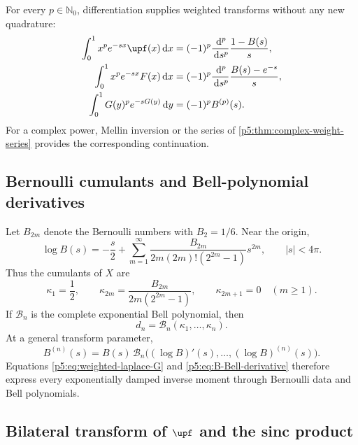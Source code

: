 \documentclass[11pt,oneside]{article}
\theoremstyle{definition}
\theoremstyle{remark}
\newcommand{\N}{\mathbb N}
\newcommand{\dd}{\,\mathrm d}
\newcommand{\1}{\mathbf 1}
\begin{document}
For every $p\in\N_0$, differentiation supplies weighted transforms without any new quadrature:
\begin{align}
 \int_0^1x^pe^{-sx}\upf(x)\dd x
 &=(-1)^p\frac{\dd^p}{\dd s^p}\frac{1-B(s)}s,\label{p5:eq:weighted-laplace-up}\\
 \int_0^1x^pe^{-sx}F(x)\dd x
 &=(-1)^p\frac{\dd^p}{\dd s^p}\frac{B(s)-e^{-s}}s,\label{p5:eq:weighted-laplace-F}\\
 \int_0^1G(y)^pe^{-sG(y)}\dd y
 &=(-1)^pB^{(p)}(s).\label{p5:eq:weighted-laplace-G}
\end{align}
For a complex power, Mellin inversion or the series of \cref{p5:thm:complex-weight-series} provides the corresponding continuation.

\subsection{Bernoulli cumulants and Bell-polynomial derivatives}

Let $B_{2m}$ denote the Bernoulli numbers with $B_2=1/6$.  Near the origin,
\begin{equation}\label{p5:eq:log-B-Bernoulli}
 \log B(s)=-\frac{s}{2}
 +\sum_{m=1}^{\infty}
 \frac{B_{2m}}{2m(2m)!(2^{2m}-1)}s^{2m},
 \qquad |s|<4\pi.
\end{equation}
Thus the cumulants of $X$ are
\begin{equation}\label{p5:eq:cumulants-X}
 \kappa_1=\frac12,
 \qquad
 \kappa_{2m}=\frac{B_{2m}}{2m(2^{2m}-1)},
 \qquad
 \kappa_{2m+1}=0\quad(m\ge1).
\end{equation}
If $\mathcal B_n$ is the complete exponential Bell polynomial, then
\begin{equation}\label{p5:eq:moments-Bell}
 d_n=\mathcal B_n(\kappa_1,\ldots,\kappa_n).
\end{equation}
At a general transform parameter,
\begin{equation}\label{p5:eq:B-Bell-derivative}
 B^{(n)}(s)=B(s)\,
 \mathcal B_n\bigl((\log B)'(s),\ldots,(\log B)^{(n)}(s)\bigr).
\end{equation}
Equations \eqref{p5:eq:weighted-laplace-G} and \eqref{p5:eq:B-Bell-derivative} therefore express every exponentially damped inverse moment through Bernoulli data and Bell polynomials.

\subsection{Bilateral transform of $\upf$ and the sinc product}
\end{document}
